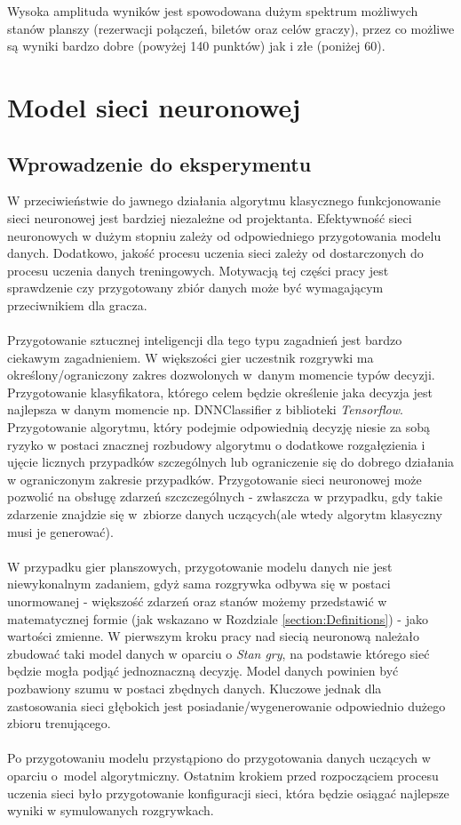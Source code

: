 \documentclass[12pt, oneside]{report}
\begin{document}
Wysoka amplituda wyników jest spowodowana dużym spektrum możliwych stanów planszy (rezerwacji połączeń, biletów oraz celów graczy), przez co możliwe są wyniki bardzo dobre (powyżej 140 punktów) jak i złe (poniżej 60). 
\chapter{Model sieci neuronowej}
\section{Wprowadzenie do eksperymentu}
W przeciwieństwie do jawnego działania algorytmu klasycznego 
funkcjonowanie sieci neuronowej jest bardziej niezależne od projektanta. Efektywność sieci neuronowych w dużym stopniu zależy od odpowiedniego przygotowania modelu danych. Dodatkowo, jakość procesu uczenia sieci zależy od dostarczonych do procesu uczenia danych treningowych. Motywacją tej części pracy jest sprawdzenie czy przygotowany zbiór danych może być wymagającym przeciwnikiem dla gracza. \\ \\
Przygotowanie sztucznej inteligencji dla tego typu zagadnień jest bardzo ciekawym zagadnieniem. W większości gier uczestnik rozgrywki ma określony/ograniczony zakres dozwolonych w~danym momencie typów decyzji. Przygotowanie klasyfikatora, którego celem będzie określenie jaka decyzja jest najlepsza w danym momencie np. DNNClassifier z biblioteki \textit{Tensorflow}. Przygotowanie algorytmu, który podejmie odpowiednią decyzję niesie za sobą ryzyko w postaci znacznej rozbudowy algorytmu o dodatkowe rozgałęzienia i ujęcie licznych przypadków szczególnych lub ograniczenie się do dobrego działania w ograniczonym zakresie przypadków. Przygotowanie sieci neuronowej może pozwolić na obsługę zdarzeń szczczególnych - zwłaszcza w przypadku, gdy takie zdarzenie znajdzie się w~zbiorze danych uczących(ale wtedy algorytm klasyczny musi je generować).
 \\ \\ W przypadku gier planszowych, przygotowanie modelu danych nie jest niewykonalnym zadaniem, gdyż sama rozgrywka odbywa się w postaci unormowanej - większość zdarzeń oraz stanów możemy przedstawić w matematycznej formie (jak wskazano w Rozdziale \ref{section:Definitions}) - jako wartości zmienne. W pierwszym kroku pracy nad siecią neuronową należało zbudować taki model danych w oparciu o \textit{Stan gry}, na podstawie którego sieć będzie mogła podjąć jednoznaczną decyzję. Model danych powinien być pozbawiony szumu w postaci zbędnych danych.
 Kluczowe jednak dla zastosowania sieci głębokich jest posiadanie/wygenerowanie odpowiednio dużego zbioru trenującego.
 \\ \\ Po przygotowaniu modelu przystąpiono do przygotowania danych uczących w oparciu o~model algorytmiczny. Ostatnim krokiem przed rozpocząciem procesu uczenia sieci było przygotowanie konfiguracji sieci, która będzie osiągać najlepsze wyniki w symulowanych rozgrywkach.
\end{document}

